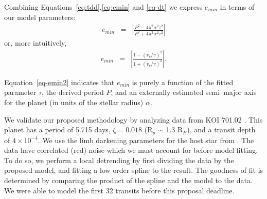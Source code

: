 Combining Equations~\ref{eq:tdd},\ref{eq:emin} and \ref{eq-dt} we express $e_{min}$ in terms of our model
parameters:
\begin{eqnarray}
e_{min} & = & \left| \frac{P^{2} - 4 \pi^{2} \alpha^{2} \tau^{2}}{P^{2} + 4 \pi^{2} \alpha^{2} \tau^{2}} \right| 
\label{eq-emin2}
\end{eqnarray}
or, more intuitively,
\begin{eqnarray}
e_{min} & = & \left| \frac{1 - (v_c/v)^2}{1 + (v_c/v)^2} \right| .
\label{eq-emin3}
\end{eqnarray}

Equation~\ref{eq-emin2} indicates that $e_{min}$ is purely a function
of the fitted parameter $\tau$, the derived period $P$, and an
externally estimated semi--major axis for the planet (in units of the
stellar radius) $\alpha$.  

%

\medskip
{\centerline{}}
\smallskip

We validate our proposed methodology by analyzing \kepler data from KOI
701.02 \citep[Kepler 62--b;][]{2013arXiv1304.7387B}.  This planet has
a period of 5.715 days, $\zeta = 0.018$ (R$_p$ $\sim$ 1.3 R$_E$), and
a transit depth of $4 \times 10^{-4}$.  We use the limb darkening
parameters for the host star from
\cite{2010A&A...510A..21S}.  The \kepler data have correlated (red) noise
which we must account for before model fitting.  To do so, we perform
a local detrending by first dividing the data by the proposed model,
and fitting a low order spline to the result.  The goodness of fit is
determined by comparing the product of the spline and the model to the
data.  We were able to model the first 32 transits before this
proposal deadline.



